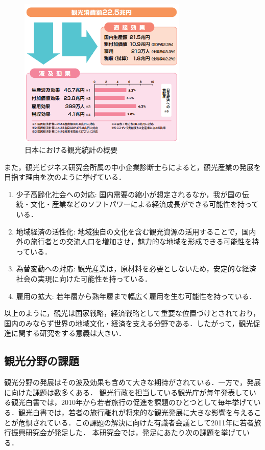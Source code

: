 \documentclass{jsarticle}
\begin{document}
\begin{figure}[!ht]
\begin{center}
\includegraphics[width=8.0cm]{./image/tourism_kibo.png}
\caption{日本における観光統計の概要\cite{tourism_stat}}
\label{tourism_kibo}
\end{center}
\end{figure}

また，観光ビジネス研究会所属の中小企業診断士らによると，観光産業の発展を目指す理由を次のように挙げている\cite{tourism_future}．

\begin{enumerate}
\item 少子高齢化社会への対応: 国内需要の縮小が想定されるなか，我が国の伝統・文化・産業などのソフトパワーによる経済成長ができる可能性を持っている．
\item 地域経済の活性化: 地域独自の文化を含む観光資源の活用することで，国内外の旅行者との交流人口を増加させ，魅力的な地域を形成できる可能性を持っている．
\item 為替変動への対応: 観光産業は，原材料を必要としないため，安定的な経済社会の実現に向けた可能性を持っている．
\item 雇用の拡大: 若年層から熟年層まで幅広く雇用を生む可能性を持っている．
\end{enumerate}


以上のように，観光は国家戦略，経済戦略として重要な位置づけとされており，国内のみならず世界の地域文化・経済を支える分野である．したがって，観光促進に関する研究をする意義は大きい．

\subsection{観光分野の課題}

観光分野の発展はその波及効果も含めて大きな期待がされている．一方で，発展に向けた課題は数多くある．
観光行政を担当している観光庁が毎年発表している観光白書では，2010年から若者旅行の促進を課題のひとつとして毎年挙げている\cite{kanko_hakusho_2009}\cite{kanko_hakusho_2010}\cite{kanko_hakusho_2011}\cite{kanko_hakusho_2012}\cite{kanko_hakusho_2013}\cite{kanko_hakusho_2014}．観光白書では，若者の旅行離れが将来的な観光発展に大きな影響を与えることが危惧されている．この課題の解決に向けた有識者会議として2011年に若者旅行振興研究会が発足した．
本研究会では，発足にあたり次の課題を挙げている\cite{wakamono_shinko}．
\end{document}
